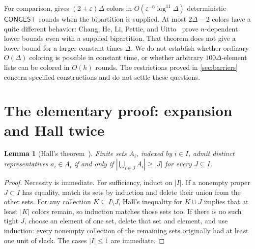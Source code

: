 \documentclass[11pt]{article}
\newtheorem{lemma}[theorem]{Lemma}
\theoremstyle{definition}
\theoremstyle{remark}
\newcommand{\eps}{\varepsilon}
\newcommand{\abs}[1]{\left|#1\right|}
\newcommand{\CONGEST}{\ensuremath{\mathsf{CONGEST}}}
\begin{document}
For comparison, \cite[Lemma 6.1]{BBKO} gives $(2+\eps)\Delta$ colors in
$O(\eps^{-6}\log^{11}\Delta)$ deterministic \CONGEST\ rounds when the
bipartition is supplied. At most $2\Delta-2$ colors have a quite different
behavior: Chang, He, Li, Pettie, and Uitto~\cite[Theorem 2]{CHLPU} prove
$n$-dependent lower bounds even with a supplied bipartition. That theorem
does not give a lower bound for a larger constant times $\Delta$.
We do not establish whether ordinary $O(\Delta)$ coloring is possible in
constant time, or whether arbitrary $100\Delta$-element lists can be
colored in $O(h)$ rounds. The restrictions proved in \cref{sec:barriers}
concern specified constructions and do not settle these questions.

\section{The elementary proof: expansion and Hall twice}\label{sec:hall}

\begin{lemma}[Hall's theorem~\cite{Hall}]\label{lem:hall}
Finite sets $A_i$, indexed by $i\in I$, admit distinct representatives
$a_i\in A_i$ if and only if
$\abs{\bigcup_{i\in J}A_i}\ge\abs J$ for every $J\subseteq I$.
\end{lemma}
\begin{proof}
Necessity is immediate. For sufficiency, induct on $\abs I$.
If a nonempty proper $J\subset I$ has equality, match its sets by
induction and delete their union from the other sets. For any collection
$K\subseteq I\setminus J$, Hall's inequality for $K\cup J$ implies that
at least $\abs K$ colors remain, so induction matches those sets too.
If there is no such tight $J$, choose an element of one set, delete that
set and element, and use induction: every nonempty collection of the
remaining sets originally had at least one unit of slack. The cases
$\abs I\le1$ are immediate.
\end{proof}
\end{document}
